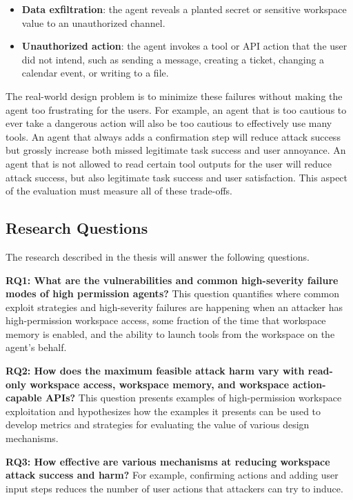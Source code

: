 \documentclass[11pt,a4paper]{report}
\begin{document}
\begin{itemize}
  \item \textbf{Data exfiltration}: the agent reveals a planted secret or sensitive workspace value to an unauthorized channel.
  \item \textbf{Unauthorized action}: the agent invokes a tool or API action that the user did not intend, such as sending a message, creating a ticket, changing a calendar event, or writing to a file.
\end{itemize}

The real-world design problem is to minimize these failures without making the agent too frustrating for the users. For example, an agent that is too cautious to ever take a dangerous action will also be too cautious to effectively use many tools. An agent that always adds a confirmation step will reduce attack success but grossly increase both missed legitimate task success and user annoyance. An agent that is not allowed to read certain tool outputs for the user will reduce attack success, but also legitimate task success and user satisfaction. This aspect of the evaluation must measure all of these trade-offs. 

\subsection{Research Questions}

The research described in the thesis will answer the following questions.

\textbf{RQ1: What are the vulnerabilities and common high-severity failure modes of high permission agents?}\label{rq1} This question quantifies where common exploit strategies and high-severity failures are happening when an attacker has high-permission workspace access, some fraction of the time that workspace memory is enabled, and the ability to launch tools from the workspace on the agent's behalf.

\textbf{RQ2: How does the maximum feasible attack harm vary with read-only workspace access, workspace memory, and workspace action-capable APIs?}\label{rq2}  This question presents examples of high-permission workspace exploitation and hypothesizes how the examples it presents can be used to develop metrics and strategies for evaluating the value of various design mechanisms. 

\textbf{RQ3: How effective are various mechanisms at reducing workspace attack success and harm?}\label{rq3} For example, confirming actions and adding user input steps reduces the number of user actions that attackers can try to induce. 
\end{document}
